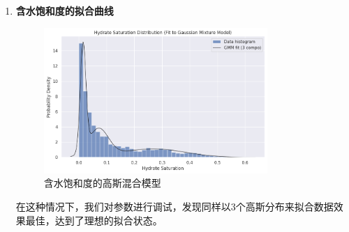 \documentclass[12pt,a4paper]{nmmcm}
\begin{document}
\begin{enumerate}
  \item \textbf{含水饱和度的拟合曲线} \\
        \begin{figure}[h]
          \centering
          \includegraphics[width=0.8\textwidth]{figures/task2/task2-3.png}
          \caption{含水饱和度的高斯混合模型}
        \end{figure}

        在这种情况下，我们对参数进行调试，发现同样以3个高斯分布来拟合数据效果最佳，达到了理想的拟合状态。


\end{enumerate}
\end{document}
